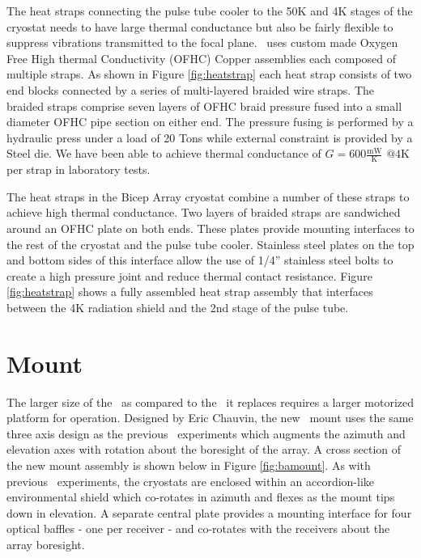 \documentclass[]{spie}  %
\begin{document}
The heat straps connecting the pulse tube cooler to the 50K and 4K stages of
the cryostat needs to have large thermal conductance but also be fairly
flexible to suppress vibrations transmitted to the focal plane. \biceparray \ 
uses custom made Oxygen Free High thermal Conductivity (OFHC) Copper
assemblies each composed of multiple straps. As shown
in Figure \ref{fig:heatstrap} each heat strap consists of two end blocks
connected by a series of multi-layered braided wire straps. The braided straps
comprise seven layers of OFHC braid pressure fused into a small diameter OFHC
pipe section on either end. The pressure fusing is performed by a hydraulic
press under a load of 20 Tons while external constraint is provided by a Steel
die. We have been able to achieve thermal conductance of $G=600
\frac{\text{mW}}{\text{K}} \text{  @}4\text{K}$ per strap in laboratory tests.

The heat straps in the Bicep Array cryostat combine a number of these straps
to achieve high thermal conductance. Two layers of braided straps are
sandwiched around an OFHC plate on both ends. These plates provide mounting
interfaces to the rest of the cryostat and the pulse tube cooler. Stainless
steel plates on the top and bottom sides of this interface allow the use of
1/4'' stainless steel bolts to create a high pressure joint and reduce thermal
contact resistance. Figure \ref{fig:heatstrap} shows a fully assembled heat
strap assembly that interfaces between the 4K radiation shield and the 2nd
stage of the pulse tube.




\section{Mount}

The larger size of the \biceparray \ as compared to the \keckarray \ it replaces
requires a larger motorized platform for operation. Designed by Eric Chauvin,
the new \biceparray \ mount uses the same three axis design as the previous
\bk \ experiments which augments the azimuth and elevation axes with
rotation about the boresight of the array. A
cross section of the new mount assembly is shown below in Figure
\ref{fig:bamount}. As with previous \bk \ experiments, the cryostats
are enclosed within an accordion-like environmental shield which co-rotates in
azimuth and flexes as the mount tips down in elevation. A separate central
plate provides a mounting interface for four optical baffles - one per
receiver - and co-rotates with the receivers about the array boresight.
\end{document}
